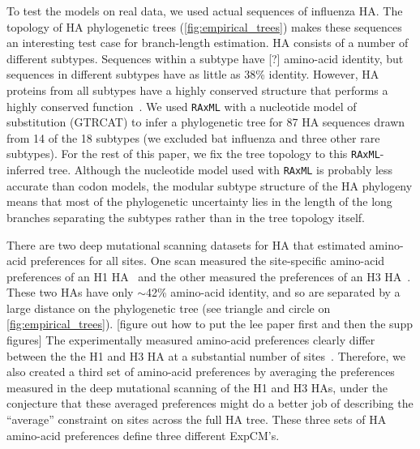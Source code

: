 \documentclass[11pt]{article}
\newcommand\skhcomment[1]{{\color{cyan}[#1]}}
\newcommand\jdbcomment[1]{{\color{red}[#1]}}
\begin{document}
To test the models on real data, we used actual sequences of influenza HA. 
The topology of HA phylogenetic trees (\ref{fig:empirical_trees}) makes these sequences an interesting test case for branch-length estimation.
HA consists of a number of different subtypes.
Sequences within a subtype have \jdbcomment{?} amino-acid identity, but sequences in different subtypes have as little as 38\% identity.
However, HA proteins from all subtypes have a highly conserved structure that performs a highly conserved function~\citep{ha2002h5,russell2004h1}.
We used \texttt{RAxML} with a nucleotide model of substitution (GTRCAT) to infer a phylogenetic tree for 87 HA sequences drawn from 14 of the 18 subtypes (we excluded bat influenza and three other rare subtypes).
For the rest of this paper, we fix the tree topology to this \texttt{RAxML}-inferred tree.
Although the nucleotide model used with \texttt{RAxML} is probably less accurate than codon models, the modular subtype structure of the HA phylogeny means that most of the phylogenetic uncertainty lies in the length of the long branches separating the subtypes rather than in the tree topology itself.

There are two deep mutational scanning datasets for HA that estimated amino-acid preferences for all sites.
One scan measured the site-specific amino-acid preferences of an H1 HA~\citep{doud2016accurate} and the other measured the preferences of an H3 HA~\citep{lee2018deep}.
These two HAs have only $\sim$42\% amino-acid identity, and so are separated by a large distance on the phylogenetic tree (see triangle and circle on \ref{fig:empirical_trees}).
\skhcomment{figure out how to put the lee paper first and then the supp figures}
The experimentally measured amino-acid preferences clearly differ between the the H1 and H3 HA at a substantial number of sites~\citep[\ref{suppfig:prefs_doud}, 
\ref{suppfig:prefs_lee};][]{lee2018deep}.
Therefore, we also created a third set of amino-acid preferences by averaging the preferences measured in the deep mutational scanning of the H1 and H3 HAs, under the conjecture that these averaged preferences might do a better job of describing the ``average'' constraint on sites across the full HA tree.
These three sets of HA amino-acid preferences define three different ExpCM's.
 
\end{document}
